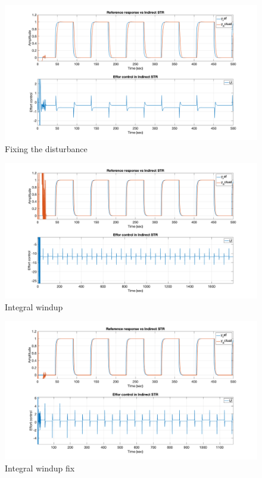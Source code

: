 \begin{figure}
	\centering
	\includegraphics[width=\textwidth]{images/str82.png}
	\caption{Fixing the disturbance}
	\label{fig:str82}
\end{figure}

\begin{figure}
	\centering
	\includegraphics[width=\textwidth]{images/str83.png}
	\caption{Integral windup}
	\label{fig:str83}
\end{figure}

\begin{figure}
	\centering
	\includegraphics[width=\textwidth]{images/str84.png}
	\caption{Integral windup fix}
	\label{fig:str84}
\end{figure}

